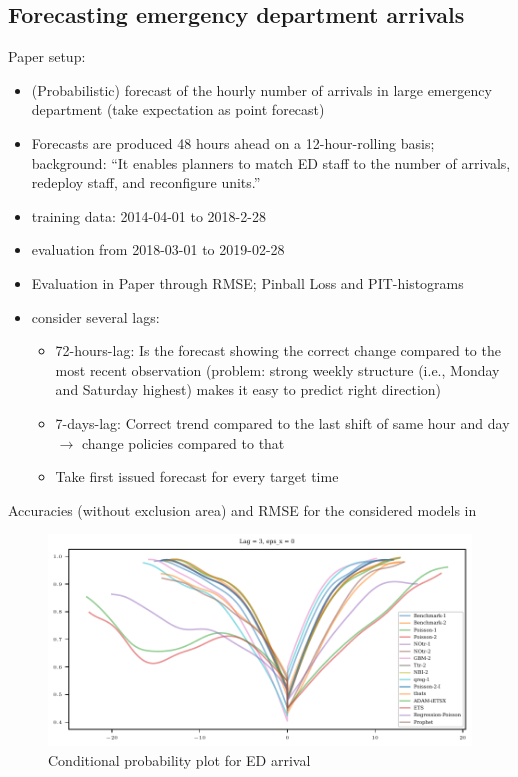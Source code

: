 \subsection{Forecasting emergency department arrivals}\label{sec:application-eda}

\textcite{Rostami-Tabar2023}

Paper setup:

\begin{itemize}
    \item (Probabilistic) forecast of the hourly number of arrivals in large emergency department (take expectation as point forecast)
    \item Forecasts are produced 48 hours ahead on a 12-hour-rolling basis; background: \enquote{It enables planners to match ED staff to the number of arrivals, redeploy staff, and reconfigure units.}
    \item training data: 2014-04-01 to 2018-2-28
    \item evaluation from 2018-03-01 to 2019-02-28
    \item Evaluation in Paper through RMSE; Pinball Loss and PIT-histograms
    \item consider several lags:
    \begin{itemize}
        \item 72-hours-lag: Is the forecast showing the correct change compared to the most recent observation (problem: strong weekly structure (i.e., Monday and Saturday highest) makes it easy to predict right direction)
        \item 7-days-lag: Correct trend compared to the last shift of same hour and day $\rightarrow$ change policies compared to that
        \item Take first issued forecast for every target time
    \end{itemize}
\end{itemize}

\begin{table}
\centering

\caption{Accuracies (without exclusion area) and RMSE for the considered models in \textcite{Rostami-Tabar2023}}	
\end{table}

\begin{figure}
	\centering
	\includegraphics{plots/ed_arrival/Cond_Prob_lag_3.pdf}
        \caption{Conditional probability plot for ED arrival}
\end{figure}